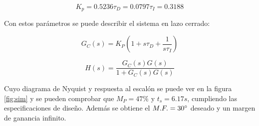 \documentclass[a4paper]{article}
\begin{document}
\begin{subequations}
	\begin{equation}
		K_p = 0.5236
	\end{equation}
	\begin{equation}
		\tau_D = 0.0797
	\end{equation}
	\begin{equation}
		\tau_I= 0.3188
	\end{equation}
\end{subequations}

Con estos parámetros se puede describir el sistema en lazo cerrado:

\begin{equation}
G_C(s)=K_P (1 + s \tau_D + \frac{1}{s\tau_I})
\end{equation}

\begin{equation}
H(s)=\frac{G_C(s) G(s)}{1 + G_C(s) G(s)}
\end{equation}

Cuyo diagrama de Nyquist y respuesta al escalón se puede ver en la figura \ref{fig:sim} y se pueden comprobar que $M_P=47\%$ y $t_s=6.17 s$, cumpliendo las especificaciones de diseño. Además se obtiene el $M.F. = 30\degree$ deseado y un margen de ganancia infinito.
\end{document}
